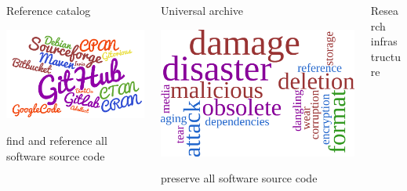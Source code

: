 \documentclass[aspectratio=169,xcolor=table]{beamer}
\begin{document}
\begin{frame}
        \begin{columns}
            \begin{column}{.3\columnwidth}
                \begin{block}{Reference catalog}
                    \begin{center}
                        \includegraphics[width=.6\linewidth]{img/myriadsources}
                    \end{center}
                    \alert{find} and \alert{reference} all software source code
                \end{block}
            \end{column}
            \begin{column}{.3\columnwidth}
                \begin{block}{Universal archive}
                    \begin{center}
                        \includegraphics[width=.6\linewidth]{img/fragilecloud}
                    \end{center}
                    \alert{preserve} all software source code
                \end{block}
            \end{column}
            \begin{column}{.3\columnwidth}
                \begin{block}{Research infrastructure}
                    \begin{center}

\end{center}
\end{block}
\end{column}
\end{columns}
\end{frame}
\end{document}
